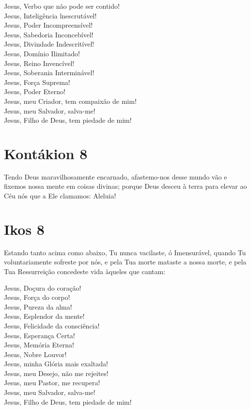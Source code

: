 \documentclass{subfiles}
\begin{document}
Jesus, Verbo que não pode ser contido! \\
Jesus, Inteligência lnescrutável! \\
Jesus, Poder Incompreensível! \\
Jesus, Sabedoria Inconcebível! \\
Jesus, Divindade Indescritível! \\
Jesus, Domínio Ilimitado! \\
Jesus, Reino Invencível! \\
Jesus, Soberania Interminável! \\
Jesus, Força Suprema! \\
Jesus, Poder Eterno! \\
Jesus, meu Criador, tem compaixão de mim! \\
Jesus, meu Salvador, salva-me! \\
Jesus, Filho de Deus, tem piedade de mim!

\section*{Kontákion 8}

Tendo Deus maravilhosamente encarnado, afastemo-nos desse
mundo vão e fixemos nossa mente em coisas divinas; porque Deus desceu à
terra para elevar ao Céu nós que a Ele clamamos: Aleluia!

\section*{Ikos 8}

Estando tanto acima como abaixo, Tu nunca vacilaste, ó Imensurável,
quando Tu voluntariamente sofreste por nós, e pela Tua morte mataste a
nossa morte, e pela Tua Ressurreição concedeste vida àqueles que cantam:

Jesus, Doçura do coração! \\
Jesus, Força do corpo! \\
Jesus, Pureza da alma! \\
Jesus, Esplendor da mente! \\
Jesus, Felicidade da consciência! \\
Jesus, Esperança Certa! \\
Jesus, Memória Eterna! \\
Jesus, Nobre Louvor! \\
Jesus, minha Glória mais exaltada! \\
Jesus, meu Desejo, não me rejeites! \\
Jesus, meu Pastor, me recupera! \\
Jesus, meu Salvador, salva-me! \\
Jesus, Filho de Deus, tem piedade de mim!
\end{document}
